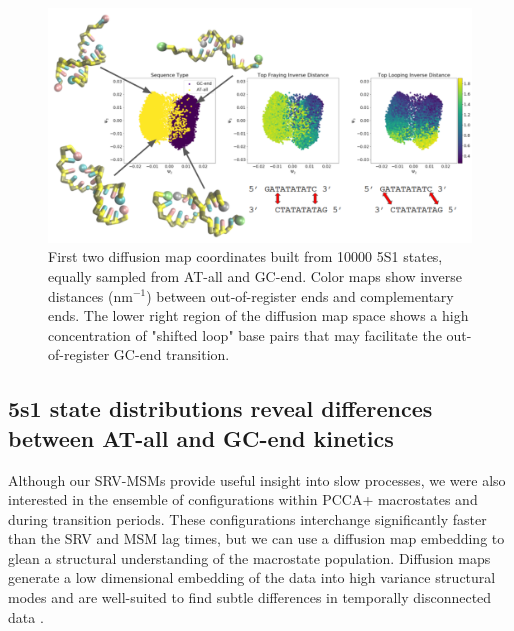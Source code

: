 \documentclass[journal=jpcbfk,manuscript=article]{achemso}
\begin{document}
\begin{figure}[ht!]
	\begin{center}
        \includegraphics[width=150mm, scale=1]{Fig8.pdf}
        \caption{First two diffusion map coordinates built from 10000 5S1 states, equally sampled from AT-all and GC-end. Color maps show inverse distances (nm$^{-1}$) between out-of-register ends and complementary ends. The lower right region of the diffusion map space shows a high concentration of "shifted loop" base pairs that may facilitate the out-of-register GC-end transition.}
        \label{fig:GC-end_dmaps}
	\end{center}
\end{figure}

\subsection{5s1 state distributions reveal differences between AT-all and GC-end kinetics}

Although our SRV-MSMs provide useful insight into slow processes, we were also interested in the ensemble of configurations within PCCA+ macrostates and during transition periods. These configurations interchange significantly faster than the SRV and MSM lag times, but we can use a diffusion map embedding to glean a structural understanding of the macrostate population. Diffusion maps generate a low dimensional embedding of the data into high variance structural modes and are well-suited to find subtle differences in temporally disconnected data \citep{Coifman2006DiffusionMaps, Ferguson2010SystematicMaps}.
\end{document}

